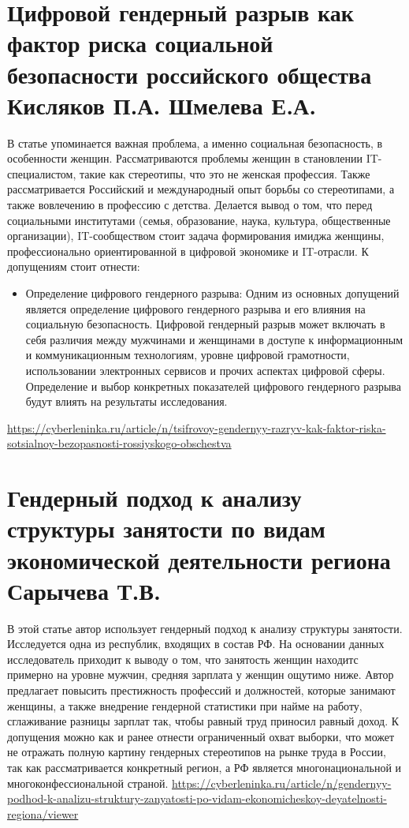 \documentclass[a4paper,14pt]{article}
\begin{document}
\section{Цифровой гендерный разрыв как фактор риска социальной безопасности российского общества Кисляков П.А. Шмелева Е.А.}
В статье упоминается важная проблема, а именно социальная безопасность, в особенности женщин. Рассматриваются проблемы женщин в становлении IT-специалистом, такие как стереотипы, что это не женская профессия. Также рассматривается Российский и международный опыт борьбы со стереотипами, а также вовлечению в профессию с детства. Делается вывод о том, что перед социальными институтами (семья, образование, наука, культура, общественные организации), IT-сообществом стоит задача формирования имиджа женщины, профессионально ориентированной в цифровой экономике и IT-отрасли. 
К допущениям стоит отнести:

\begin{itemize}
    \item Определение цифрового гендерного разрыва: Одним из основных допущений является определение цифрового гендерного разрыва и его влияния на социальную безопасность. Цифровой гендерный разрыв может включать в себя различия между мужчинами и женщинами в доступе к информационным и коммуникационным технологиям, уровне цифровой грамотности, использовании электронных сервисов и прочих аспектах цифровой сферы. Определение и выбор конкретных показателей цифрового гендерного разрыва будут влиять на результаты исследования. 
\end{itemize}
\url{https://cyberleninka.ru/article/n/tsifrovoy-gendernyy-razryv-kak-faktor-riska-sotsialnoy-bezopasnosti-rossiyskogo-obschestva}
\section{Гендерный подход к анализу структуры занятости по видам экономической деятельности региона Сарычева Т.В.}
В этой статье автор использует гендерный подход к анализу структуры занятости. Исследуется одна из республик, входящих в состав РФ. На основании данных исследователь приходит к выводу о том, что занятость женщин находитс примерно на уровне мужчин, средняя зарплата у женщин ощутимо ниже. Автор предлагает повысить престижность профессий и должностей, которые занимают женщины, а также внедрение гендерной статистики при найме на работу, сглаживание разницы зарплат так, чтобы равный труд приносил равный доход. К допущения можно как и ранее отнести ограниченный охват выборки, что может не отражать полную картину гендерных стереотипов на рынке труда в России, так как рассматривается конкретный регион, а РФ является многонациональной и многоконфессиональной страной. 
\url{https://cyberleninka.ru/article/n/gendernyy-podhod-k-analizu-struktury-zanyatosti-po-vidam-ekonomicheskoy-deyatelnosti-regiona/viewer}
\end{document}
